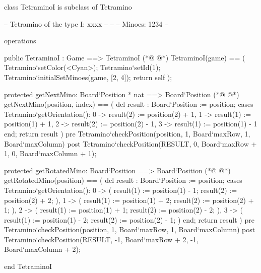\begin{vdmpp}[breaklines=true]
class TetraminoI is subclass of Tetramino

 -- Tetramino of the type I: xxxx
 -- 
 --
 -- Minoes:         1234
 -- 
 
  
 operations
 
  public TetraminoI : Game ==> TetraminoI
(*@
\label{TetraminoI:13}
@*)
  TetraminoI(game) == (
   Tetramino`setColor(<Cyan>);
   Tetramino`setId(1);
   Tetramino`initialSetMinoes(game, [2, 4]);
   return self
  );
  
  protected getNextMino: Board`Position * nat ==> Board`Position
(*@
\label{getNextMino:21}
@*)
  getNextMino(position, index) == (
   dcl result : Board`Position := position;
   cases Tetramino`getOrientation():
    0 -> result(2) := position(2) + 1,
    1 -> result(1) := position(1) + 1,
    2 -> result(2) := position(2) - 1,
    3 -> result(1) := position(1) - 1
   end;
   return result
  )
  pre Tetramino`checkPosition(position, 1, Board`maxRow, 1, Board`maxColumn)
  post Tetramino`checkPosition(RESULT, 0, Board`maxRow + 1, 0, Board`maxColumn + 1);
  
  protected getRotatedMino: Board`Position ==> Board`Position
(*@
\label{getRotatedMino:35}
@*)
  getRotatedMino(position) == (
   dcl result : Board`Position := position;
   cases Tetramino`getOrientation():
    0 -> (
     result(1) := position(1) - 1; 
     result(2) := position(2) + 2;
     ),
    1 -> (
     result(1) := position(1) + 2; 
     result(2) := position(2) + 1;
     ),
    2 -> (
     result(1) := position(1) + 1; 
     result(2) := position(2) - 2;
     ),
    3 -> (
     result(1) := position(1) - 2; 
     result(2) := position(2) - 1;
     )
   end;
   return result
  )
  pre Tetramino`checkPosition(position, 1, Board`maxRow, 1, Board`maxColumn)
  post Tetramino`checkPosition(RESULT, -1, Board`maxRow + 2, -1, Board`maxColumn + 2); 
  
      
end TetraminoI
\end{vdmpp}
